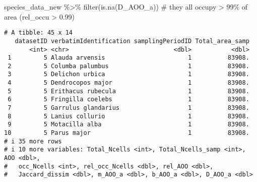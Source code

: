 \documentclass[
  letterpaper,
  DIV=11,
  numbers=noendperiod]{scrreprt}
\newenvironment{Shaded}{\begin{snugshade}}{\end{snugshade}}
\newcommand{\CommentTok}[1]{\textcolor[rgb]{0.37,0.37,0.37}{#1}}
\newcommand{\FunctionTok}[1]{\textcolor[rgb]{0.28,0.35,0.67}{#1}}
\newcommand{\NormalTok}[1]{\textcolor[rgb]{0.00,0.23,0.31}{#1}}
\newcommand{\SpecialCharTok}[1]{\textcolor[rgb]{0.37,0.37,0.37}{#1}}
\begin{document}
\begin{Shaded}
\begin{Highlighting}[]
\NormalTok{species\_data\_new }\SpecialCharTok{\%\textgreater{}\%}
  \FunctionTok{filter}\NormalTok{(}\FunctionTok{is.na}\NormalTok{(D\_AOO\_a)) }\CommentTok{\# they all occupy \textgreater{} 99\% of area (rel\_occu \textgreater{} 0.99)}
\end{Highlighting}
\end{Shaded}

\begin{verbatim}
# A tibble: 45 x 14
   datasetID verbatimIdentification samplingPeriodID Total_area_samp
       <int> <chr>                             <dbl>           <dbl>
 1         5 Alauda arvensis                       1          83908.
 2         5 Columba palumbus                      1          83908.
 3         5 Delichon urbica                       1          83908.
 4         5 Dendrocopos major                     1          83908.
 5         5 Erithacus rubecula                    1          83908.
 6         5 Fringilla coelebs                     1          83908.
 7         5 Garrulus glandarius                   1          83908.
 8         5 Lanius collurio                       1          83908.
 9         5 Motacilla alba                        1          83908.
10         5 Parus major                           1          83908.
# i 35 more rows
# i 10 more variables: Total_Ncells <int>, Total_Ncells_samp <int>, AOO <dbl>,
#   occ_Ncells <int>, rel_occ_Ncells <dbl>, rel_AOO <dbl>,
#   Jaccard_dissim <dbl>, m_AOO_a <dbl>, b_AOO_a <dbl>, D_AOO_a <dbl>
\end{verbatim}
\end{document}
